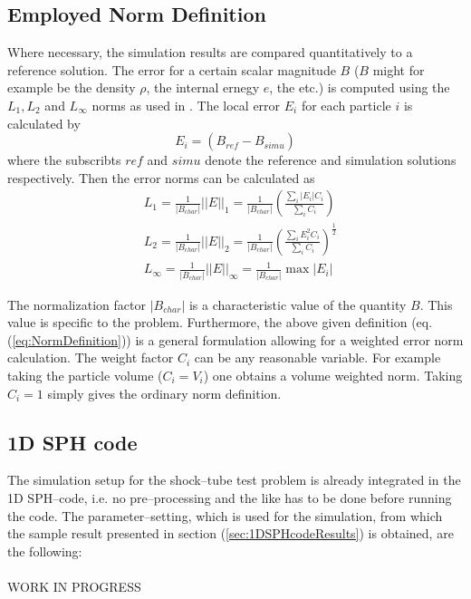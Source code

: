 \documentclass{report}
\newcommand{\norm}[1]{\left|#1\right|}
\newcommand{\nnorm}[1]{\left|\left|#1\right|\right|}
\begin{document}
\subsection{Employed Norm Definition}
\label{sec:employedNormDefinition}
Where necessary, the simulation results are compared quantitatively to a reference solution. The error for a certain scalar magnitude $B$ ($B$ might for example be the density $\rho$, the internal ernegy $e$, the  etc.) is computed using the $L_1,L_2$ and $L_\infty$ norms as used in \cite{Novak2007}. 
The local error $E_i$ for each particle $i$ is calculated by 
\begin{equation}
 E_i=(B_{\mathit{ref}}-B_{\mathit{simu}})
\end{equation}
where the subscribts $ref$ and $simu$ denote the reference and simulation solutions respectively.
Then the error norms can be calculated as
\begin{equation}
\label{eq:NormDefinition}
\begin{split}
 & L_1=\frac{1}{\norm{B_{\mathit{char}}}}\nnorm{E}_1=\frac{1}{\norm{B_{\mathit{char}}}}\left(\frac{\sum_i \norm{E_i} C_i }{\sum_i C_i}\right)\\[0.3cm]
& L_2=\frac{1}{\norm{B_{\mathit{char}}}}\nnorm{E}_2=\frac{1}{\norm{B_{\mathit{char}}}}\left(\frac{\sum_i E^2_i C_i }{\sum_i C_i}\right)^{\frac{1}{2}}\\[0.3cm]
& L_\infty=\frac{1}{\norm{B_{\mathit{char}}}}\nnorm{E}_\infty=\frac{1}{\norm{B_{\mathit{char}}}}\max \norm{E_i}
\end{split}
\end{equation}

The normalization factor $\norm{B_{\mathit{char}}}$ is  a characteristic value of the quantity $B$. This value is specific to the problem. Furthermore, the above given definition (eq. (\ref{eq:NormDefinition})) is a general formulation allowing for a weighted error norm calculation. The weight factor $C_i$ can be any reasonable variable. For example taking the particle volume ($C_i=V_i$) one obtains a volume weighted norm. Taking $C_i=1$ simply gives the ordinary norm definition.


\subsection{1D SPH code}
\label{sec:simuSetup1DSPHcode}
The simulation setup for the shock--tube test problem is already integrated in the 1D SPH--code, i.e. no pre--processing and the like has to be done before running the code. 
The parameter--setting, which is used for the simulation, from which the sample result presented in section (\ref{sec:1DSPHcodeResults}) is obtained, are the following:
\\
\\
WORK IN PROGRESS
\end{document}
